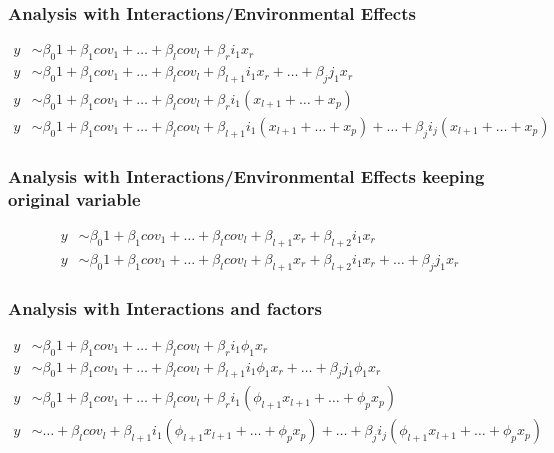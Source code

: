 \documentclass{report}
\begin{document}
\subsubsection{Analysis with Interactions/Environmental Effects}
\begin{align}
y &\sim \beta_0 1 + \beta_1 cov_1 + \dots + \beta_l cov_l + \beta_r i_1 x_r\\
y &\sim \beta_0 1 + \beta_1 cov_1 + \dots + \beta_l cov_l + \beta_{l+1} i_1 x_r + \dots  + \beta_j j_1 x_r\\
y &\sim \beta_0 1 + \beta_1 cov_1 + \dots + \beta_l cov_l + \beta_{r}  i_1 \left( x_{l+1}  + \dots + x_p\right) \\
y &\sim \beta_0 1 + \beta_1 cov_1 + \dots + \beta_l cov_l + \beta_{l+1}  i_1 \left( x_{l+1}  + \dots + x_p\right) +\dots + \beta_{j}  i_j \left( x_{l+1}  + \dots + x_p\right) 
\end{align}

\subsubsection{Analysis with Interactions/Environmental Effects keeping original variable}
\begin{align}
y &\sim\beta_0 1 + \beta_1 cov_1 + \dots + \beta_l cov_l +  \beta_{l+1} x_r +  \beta_{l+2} i_1 x_r\\
y &\sim \beta_0 1 + \beta_1 cov_1 + \dots + \beta_l cov_l + \beta_{l+1} x_r + \beta_{l+2} i_1 x_r + \dots  + \beta_j j_1 x_r
\end{align}

\subsubsection{Analysis with Interactions and factors}
\begin{align}
y &\sim \beta_0 1 + \beta_1 cov_1 + \dots + \beta_l cov_l + \beta_r i_1 \phi_1 x_r\\
y &\sim \beta_0 1 + \beta_1 cov_1 + \dots + \beta_l cov_l + \beta_{l+1} i_1 \phi_1 x_r + \dots  + \beta_j j_1 \phi_1 x_r\\
y &\sim \beta_0 1 + \beta_1 cov_1 + \dots + \beta_l cov_l + \beta_{r}  i_1 \left( \phi_{l+1} x_{l+1}  + \dots + \phi_p x_p\right) \\
y &\sim  \dots + \beta_l cov_l + \beta_{l+1}  i_1 \left(  \phi_{l+1} x_{l+1}  + \dots +  \phi_{p} x_p\right) +\dots + \beta_{j}  i_j \left( \phi_{l+1} x_{l+1}  + \dots + \phi_{p} x_p\right) 
\end{align}
\end{document}
